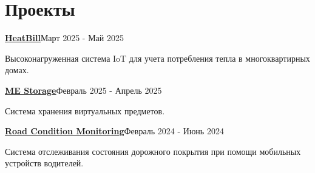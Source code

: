 \documentclass[letterpaper,11pt]{article}
\begin{document}
\section{Проекты}
\resumeSubHeadingListStart
  \resumeProjectHeading
    {\href{https://github.com/klephron/heatbill}{\underline{\textbf{HeatBill}}}}{Март 2025 - Май 2025}

    {\vspace{-10pt}\small Высоконагруженная система IoT для учета потребления тепла в многоквартирных домах. \vspace{-6pt}}

    \resumeItemListStart
    \resumeItemListEnd

  \resumeProjectHeading
    {\href{https://github.com/klephron/me-storage}{\underline{\textbf{ME Storage}}}}{Февраль 2025 - Апрель 2025}

    {\vspace{-10pt}\small Система хранения виртуальных предметов. \vspace{-6pt}}

    \resumeItemListStart
    \resumeItemListEnd

  \resumeProjectHeading
  {\href{https://github.com/klephron/road-condition-monitoring}{\underline{\textbf{Road Condition Monitoring}}}}{Февраль 2024 - Июнь 2024}

    {\vspace{-10pt}\small Система отслеживания состояния дорожного покрытия при помощи мобильных устройств водителей.\vspace{-7pt}}

  \resumeItemListStart
  \resumeItemListEnd
\resumeSubHeadingListEnd
\end{document}
